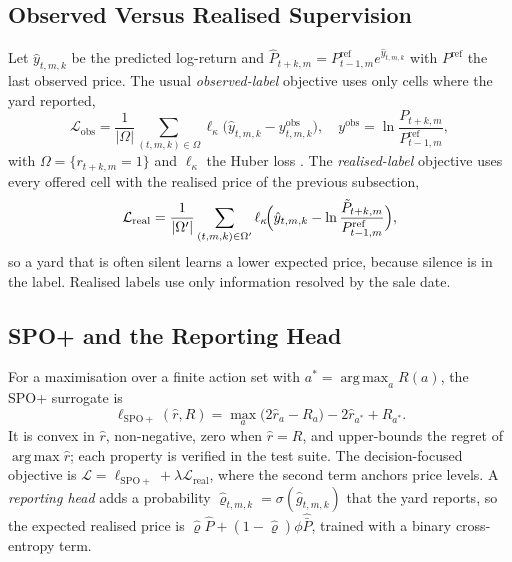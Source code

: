 \documentclass{ieeeaccess}
\DeclareMathOperator*{\argmax}{arg\,max}
\begin{document}
\subsection{Observed Versus Realised Supervision}
\label{sec:labels}
Let $\hat y_{t,m,k}$ be the predicted log-return and $\hat P_{t+k,m}=P^{\mathrm{ref}}_{t-1,m}e^{\hat y_{t,m,k}}$ with $P^{\mathrm{ref}}$ the last observed price. The usual \emph{observed-label} objective uses only cells where the yard reported,
\begin{equation}
\mathcal L_{\mathrm{obs}}=\frac{1}{|\Omega|}\sum_{(t,m,k)\in\Omega}\ell_\kappa\!\bigl(\hat y_{t,m,k}-y^{\mathrm{obs}}_{t,m,k}\bigr),\quad y^{\mathrm{obs}}=\ln\frac{P_{t+k,m}}{P^{\mathrm{ref}}_{t-1,m}},
\end{equation}
with $\Omega=\{r_{t+k,m}=1\}$ and $\ell_\kappa$ the Huber loss \cite{huber1964}. The \emph{realised-label} objective uses every offered cell with the realised price of the previous subsection,
\begin{equation}
\mathcal L_{\mathrm{real}}=\frac{1}{|\Omega'|}\sum_{(t,m,k)\in\Omega'}\ell_\kappa\!\Bigl(\hat y_{t,m,k}-\ln\frac{\tilde P_{t+k,m}}{P^{\mathrm{ref}}_{t-1,m}}\Bigr),
\end{equation}
so a yard that is often silent learns a lower expected price, because silence is in the label. Realised labels use only information resolved by the sale date.

\subsection{SPO+ and the Reporting Head}
For a maximisation over a finite action set with $a^\ast=\argmax_a R(a)$, the SPO+ surrogate \cite{elmachtoub2022} is
\begin{equation}
\ell_{\mathrm{SPO+}}(\hat r,R)=\max_{a}\bigl(2\hat r_a-R_a\bigr)-2\hat r_{a^\ast}+R_{a^\ast}.
\end{equation}
It is convex in $\hat r$, non-negative, zero when $\hat r=R$, and upper-bounds the regret of $\argmax\hat r$; each property is verified in the test suite. The decision-focused objective is $\mathcal L=\ell_{\mathrm{SPO+}}+\lambda\mathcal L_{\mathrm{real}}$, where the second term anchors price levels. A \emph{reporting head} adds a probability $\hat\varrho_{t,m,k}=\sigma(\hat g_{t,m,k})$ that the yard reports, so the expected realised price is $\hat\varrho\hat P+(1-\hat\varrho)\phi\hat{\bar P}$, trained with a binary cross-entropy term.
\end{document}
